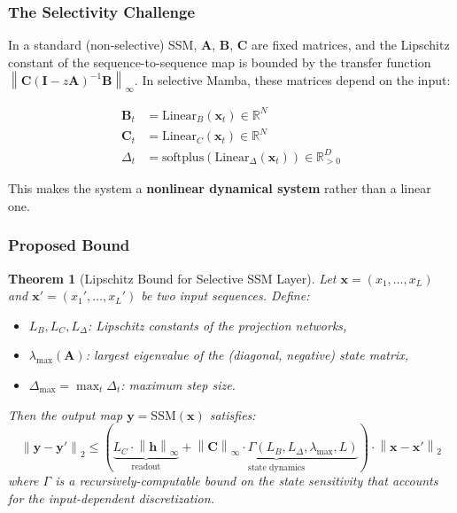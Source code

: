 \documentclass[12pt,a4paper]{article}
\newtheorem{theorem}{Theorem}
\newcommand{\R}{\mathbb{R}}
\newcommand{\norm}[1]{\left\|#1\right\|}
\begin{document}
\subsubsection{The Selectivity Challenge}

In a standard (non-selective) SSM, $\mathbf{A}$, $\mathbf{B}$, $\mathbf{C}$ are fixed matrices, and the Lipschitz constant of the sequence-to-sequence map is bounded by the transfer function $\norm{\mathbf{C}(\mathbf{I} - z\mathbf{A})^{-1}\mathbf{B}}_\infty$. In selective Mamba, these matrices depend on the input:

\begin{align}
    \mathbf{B}_t &= \text{Linear}_B(\mathbf{x}_t) \in \R^{N} \\
    \mathbf{C}_t &= \text{Linear}_C(\mathbf{x}_t) \in \R^{N} \\
    \Delta_t &= \text{softplus}(\text{Linear}_\Delta(\mathbf{x}_t)) \in \R^{D}_{>0}
\end{align}

This makes the system a \textbf{nonlinear dynamical system} rather than a linear one.

\subsubsection{Proposed Bound}

\begin{theorem}[Lipschitz Bound for Selective SSM Layer]
Let $\mathbf{x} = (x_1, \ldots, x_L)$ and $\mathbf{x}' = (x_1', \ldots, x_L')$ be two input sequences. Define:
\begin{itemize}
    \item $L_B, L_C, L_\Delta$: Lipschitz constants of the projection networks,
    \item $\lambda_{\max}(\mathbf{A})$: largest eigenvalue of the (diagonal, negative) state matrix,
    \item $\Delta_{\max} = \max_t \Delta_t$: maximum step size.
\end{itemize}
Then the output map $\mathbf{y} = \text{SSM}(\mathbf{x})$ satisfies:
\begin{equation}
    \norm{\mathbf{y} - \mathbf{y}'}_2 \leq \left(\underbrace{L_C \cdot \norm{\mathbf{h}}_\infty}_{\text{readout}} + \underbrace{\norm{\mathbf{C}}_\infty \cdot \Gamma(L_B, L_\Delta, \lambda_{\max}, L)}_{\text{state dynamics}}\right) \cdot \norm{\mathbf{x} - \mathbf{x}'}_2
\end{equation}
where $\Gamma$ is a recursively-computable bound on the state sensitivity that accounts for the input-dependent discretization.
\end{theorem}
\end{document}
